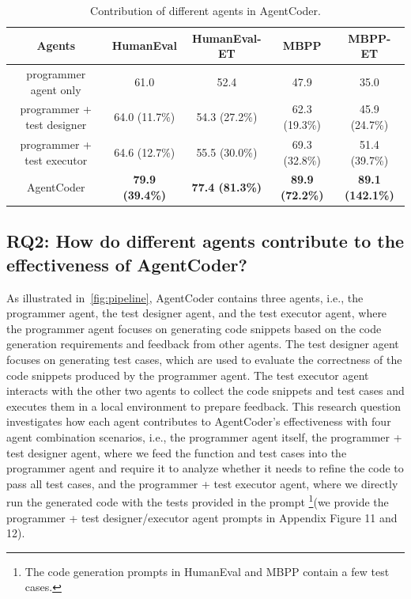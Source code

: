 \documentclass[manuscript,screen,review]{acmart}
\newcommand{\xxx}{AgentCoder\xspace}
\begin{document}
\begin{table}
    \centering
    \caption{Contribution of different agents in \xxx.}
    \begin{tabular}{c|cccc}
    \toprule
    Agents&HumanEval&HumanEval-ET&MBPP&MBPP-ET\\
    \midrule
    programmer agent only&61.0&52.4&47.9&35.0\\
programmer + test designer& 64.0 (11.7\%)&54.3 (27.2\%)&62.3 (19.3\%)&45.9 (24.7\%)\\
programmer + test executor& 64.6 (12.7\%)&55.5 (30.0\%)&69.3 (32.8\%)&51.4 (39.7\%)\\
    \xxx&\textbf{79.9 (39.4\%)}&\textbf{77.4 (81.3\%)}&\textbf{89.9 (72.2\%)}&\textbf{89.1 (142.1\%)}\\
         \bottomrule
    \end{tabular}
    \label{tab:component}
\end{table}


\subsection{RQ2: How do different agents contribute to the effectiveness of \xxx?}\label{sec:eval:end2end}
As illustrated in~\cref{fig:pipeline}, \xxx contains three agents, i.e., the programmer agent, the test designer agent, and the test executor agent, where the programmer agent focuses on generating code snippets based on the code generation requirements and feedback from other agents. The test designer agent focuses on generating test cases, which are used to evaluate the correctness of the code snippets produced by the programmer agent. The test executor agent interacts with the other two agents to collect the code snippets and test cases and executes them in a local environment to prepare feedback. This research question investigates how each agent contributes to \xxx's effectiveness with four agent combination scenarios, i.e., the programmer agent itself, the programmer + test designer agent, where we feed the function and test cases into the programmer agent and require it to analyze whether it needs to refine the code to pass all test cases, and the programmer + test executor agent, where we directly run the generated code with the tests provided in the prompt \footnote{The code generation prompts in HumanEval and MBPP contain a few test cases.
}(we provide the programmer + test designer/executor agent prompts in Appendix Figure 11 and 12).
\end{document}
